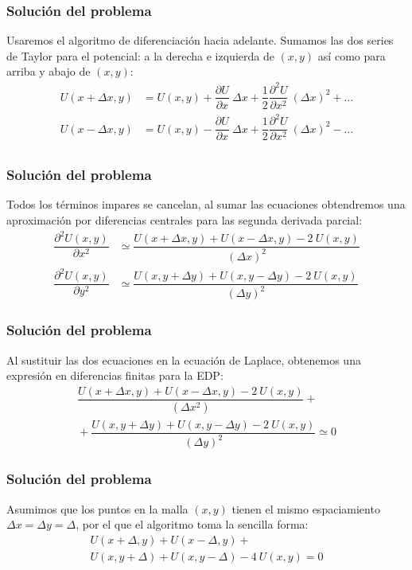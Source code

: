 \documentclass[12pt]{beamer}
\begin{document}
\begin{frame}
\frametitle{Solución del problema}
Usaremos el algoritmo de diferenciación hacia adelante. Sumamos las dos series de Taylor para el potencial: a la derecha e izquierda de $(x,y)$ así como para arriba y abajo de $(x,y)$:
\fontsize{12}{12}\selectfont
\begin{align*}
U(x + \Delta x,y) &= U(x, y) + \dfrac{\partial U}{\partial x} \: \Delta x + \dfrac{1}{2} \dfrac{\partial^{2} U}{\partial x^{2}} \: (\Delta x)^{2} + \ldots \\
U(x - \Delta x,y) &= U(x,y) - \dfrac{\partial U}{\partial x} \: \Delta x + \dfrac{1}{2} \dfrac{\partial^{2} U}{\partial x^{2}} \: (\Delta x)^{2} - \ldots \\
\end{align*}
\end{frame}
\begin{frame}
\frametitle{Solución del problema}
Todos los términos impares se cancelan, al sumar las ecuaciones obtendremos una aproximación por diferencias centrales para las segunda derivada parcial:
\fontsize{12}{12}\selectfont
\begin{align*}
\dfrac{\partial^{2} U(x,y)}{\partial x^{2}} &\simeq \dfrac{U(x+\Delta x, y) + U(x-\Delta x,y)-2 \: U(x,y)}{(\Delta x)^{2}} \\
\dfrac{\partial^{2} U(x,y)}{\partial y^{2}} &\simeq \dfrac{U(x, y+\Delta y) + U(x,y-\Delta y)-2 \: U(x,y)}{(\Delta y)^{2}}
\end{align*}
\end{frame}
\begin{frame}
\frametitle{Solución del problema}
Al sustituir las dos ecuaciones en la ecuación de Laplace, obtenemos una expresión en diferencias finitas para la EDP:
\fontsize{12}{12}\selectfont
\begin{align*}
\dfrac{U(x+\Delta x,y) + U(x-\Delta x, y) - 2 \: U(x,y)}{(\Delta x^{2})} + {} \\
{} + \dfrac{U(x,y+\Delta y) + U(x,y-\Delta y) - 2 \: U(x,y)}{(\Delta y)^{2}} \simeq 0
\end{align*}
\end{frame}
\begin{frame}
\frametitle{Solución del problema}
Asumimos que los puntos en la malla $(x,y)$ tienen el mismo espaciamiento $\Delta x =  \Delta y = \Delta$, por el que el algoritmo toma la sencilla forma:
\begin{align*}
U(x + \Delta, y) + U(x-\Delta, y) + {} \\
U(x,y +\Delta)  + U(x,y - \Delta) - 4 \: U(x,y)= 0
\end{align*}
\end{frame}
\end{document}
